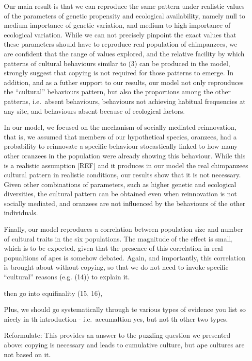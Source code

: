 \documentclass[9pt,twocolumn,twoside,]{pnas-new}
\begin{document}
Our main result is that we can reproduce the same pattern under
realistic values of the parameters of genetic propensity and ecological
availability, namely null to medium importance of genetic variation, and
medium to high importance of ecological variation. While we can not
precisely pinpoint the exact values that these parameters should have to
reproduce real population of chimpanzees, we are confident that the
range of values explored, and the relative facility by which patterns of
cultural behaviours similar to (3) can be produced in the model,
strongly suggest that copying is not required for those patterns to
emerge. In addition, and as a futher support to our results, our model
not only reprouduces the ``cultural'' behaviours pattern, but also the
proportions among the other patterns, i.e.~absent behaviours, behaviours
not achieving habitual frequencies at any site, and behaviours absent
because of ecological factors.

In our model, we focused on the mechanism of socially mediated
reinnovation, that is, we assumed that members of our hypothetical
species, oranzees, had a probability to reinnovate a specific behaviour
stocastically linked to how many other oranzees in the population were
already showing this behaviour. While this is a realistic assumption
{[}REF{]} and it produces in our model the real chimpanzees cultural
pattern in realistic conditions, our results show that it is not
necessary. Given other combinations of parameters, such as higher
genetic and ecological diversities, the cultural pattern can be obtained
even when reinnovation is not socially mediated, and oranzees are not
influenced by the behaviours of the other individuals.

Finally, our model reproduces a correlation between population size and
number of cultural traits in the six populations. The magnitude of the
effect is small, which is to be expected, given that the presence of
this correlation in real popualtions of apes is somehow debated. Again,
and importantly, this correlation is brought about without copying, so
that we do not need to invoke specific ``cultural'' reasons (e.g. (14))
to explain it.

then go into equifinality (15, 16),

Plus, we should go systematically through te various types of evidence
you list so nicely in th introduction - i.e.~accumaltion yes, but not th
other two types.

Reformulate: This provides an answer to the puzzling question we
presented above: copying is necessary and leads to cumulative culture,
but ape cultures are not based on it.
\end{document}
